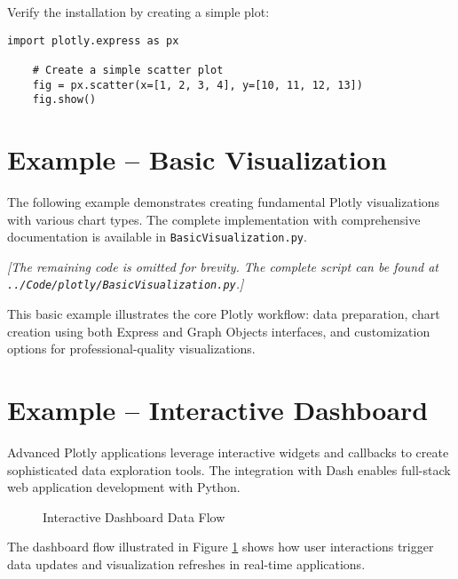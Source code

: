 Verify the installation by creating a simple plot:

\begin{lstlisting}[language=MyPython, caption={Plotly Verification}]
	import plotly.express as px
	
	# Create a simple scatter plot
	fig = px.scatter(x=[1, 2, 3, 4], y=[10, 11, 12, 13])
	fig.show()
\end{lstlisting}

\section{Example -- Basic Visualization}
\label{sec:basic_example}

The following example demonstrates creating fundamental Plotly visualizations with various chart types. The complete implementation with comprehensive documentation is available in \texttt{BasicVisualization.py}.



\noindent\textit{[The remaining code is omitted for brevity. The complete script can be found at \texttt{../Code/plotly/BasicVisualization.py}.]}

This basic example illustrates the core Plotly workflow: data preparation, chart creation using both Express and Graph Objects interfaces, and customization options for professional-quality visualizations.

\section{Example -- Interactive Dashboard}
\label{sec:dashboard_example}

Advanced Plotly applications leverage interactive widgets and callbacks to create sophisticated data exploration tools. The integration with Dash enables full-stack web application development with Python.

\clearpage

\begin{figure}[htbp]
	\centering
    
	\caption{Interactive Dashboard Data Flow}
	\label{fig:dashboard_flow}
\end{figure}

The dashboard flow illustrated in Figure \ref{fig:dashboard_flow} shows how user interactions trigger data updates and visualization refreshes in real-time applications.

